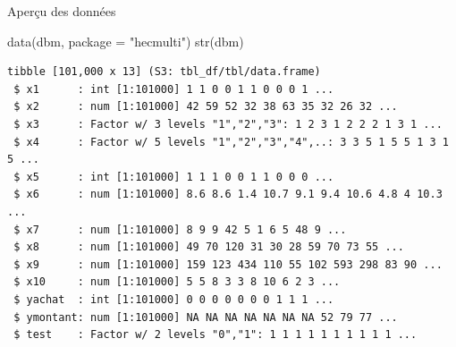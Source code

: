 \documentclass[
  ignorenonframetext,
]{beamer}
\newenvironment{Shaded}{\begin{snugshade}}{\end{snugshade}}
\newcommand{\AttributeTok}[1]{\textcolor[rgb]{0.40,0.45,0.13}{#1}}
\newcommand{\FunctionTok}[1]{\textcolor[rgb]{0.28,0.35,0.67}{#1}}
\newcommand{\NormalTok}[1]{\textcolor[rgb]{0.00,0.23,0.31}{#1}}
\newcommand{\StringTok}[1]{\textcolor[rgb]{0.13,0.47,0.30}{#1}}
\begin{document}
\begin{frame}[fragile]{Aperçu des données}
\protect\hypertarget{aperuxe7u-des-donnuxe9es}{}
\footnotesize

\begin{Shaded}
\begin{Highlighting}[numbers=left,,]
\FunctionTok{data}\NormalTok{(dbm, }\AttributeTok{package =} \StringTok{"hecmulti"}\NormalTok{)}
\FunctionTok{str}\NormalTok{(dbm)}
\end{Highlighting}
\end{Shaded}

\begin{verbatim}
tibble [101,000 x 13] (S3: tbl_df/tbl/data.frame)
 $ x1      : int [1:101000] 1 1 0 0 1 1 0 0 0 1 ...
 $ x2      : num [1:101000] 42 59 52 32 38 63 35 32 26 32 ...
 $ x3      : Factor w/ 3 levels "1","2","3": 1 2 3 1 2 2 2 1 3 1 ...
 $ x4      : Factor w/ 5 levels "1","2","3","4",..: 3 3 5 1 5 5 1 3 1 5 ...
 $ x5      : int [1:101000] 1 1 1 0 0 1 1 0 0 0 ...
 $ x6      : num [1:101000] 8.6 8.6 1.4 10.7 9.1 9.4 10.6 4.8 4 10.3 ...
 $ x7      : num [1:101000] 8 9 9 42 5 1 6 5 48 9 ...
 $ x8      : num [1:101000] 49 70 120 31 30 28 59 70 73 55 ...
 $ x9      : num [1:101000] 159 123 434 110 55 102 593 298 83 90 ...
 $ x10     : num [1:101000] 5 5 8 3 3 8 10 6 2 3 ...
 $ yachat  : int [1:101000] 0 0 0 0 0 0 0 1 1 1 ...
 $ ymontant: num [1:101000] NA NA NA NA NA NA NA 52 79 77 ...
 $ test    : Factor w/ 2 levels "0","1": 1 1 1 1 1 1 1 1 1 1 ...
\end{verbatim}

\normalsize
\end{frame}
\end{document}
